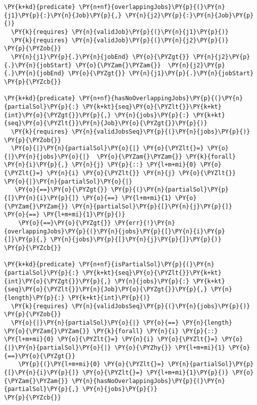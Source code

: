 \begin{Verbatim}[commandchars=\\\{\}, fontsize=\small]
\PY{k+kd}{predicate} \PY{n+nf}{overlappingJobs}\PY{p}{(}\PY{n}{j1}\PY{p}{:}\PY{n}{Job}\PY{p}{,} \PY{n}{j2}\PY{p}{:}\PY{n}{Job}\PY{p}{)}
  \PY{k}{requires} \PY{n}{validJob}\PY{p}{(}\PY{n}{j1}\PY{p}{)}
  \PY{k}{requires} \PY{n}{validJob}\PY{p}{(}\PY{n}{j2}\PY{p}{)}
\PY{p}{\PYZob{}}
  \PY{n}{j1}\PY{p}{.}\PY{n}{jobEnd} \PY{o}{\PYZgt{}} \PY{n}{j2}\PY{p}{.}\PY{n}{jobStart} \PY{o}{\PYZam{}\PYZam{}}  \PY{n}{j2}\PY{p}{.}\PY{n}{jobEnd} \PY{o}{\PYZgt{}} \PY{n}{j1}\PY{p}{.}\PY{n}{jobStart} 
\PY{p}{\PYZcb{}}

\PY{k+kd}{predicate} \PY{n+nf}{hasNoOverlappingJobs}\PY{p}{(}\PY{n}{partialSol}\PY{p}{:} \PY{k+kt}{seq}\PY{o}{\PYZlt{}}\PY{k+kt}{int}\PY{o}{\PYZgt{}}\PY{p}{,} \PY{n}{jobs}\PY{p}{:} \PY{k+kt}{seq}\PY{o}{\PYZlt{}}\PY{n}{Job}\PY{o}{\PYZgt{}}\PY{p}{)}
  \PY{k}{requires} \PY{n}{validJobsSeq}\PY{p}{(}\PY{n}{jobs}\PY{p}{)}
\PY{p}{\PYZob{}}
  \PY{o}{|}\PY{n}{partialSol}\PY{o}{|} \PY{o}{\PYZlt{}=} \PY{o}{|}\PY{n}{jobs}\PY{o}{|}  \PY{o}{\PYZam{}\PYZam{}} \PY{k}{forall} \PY{n}{i}\PY{p}{,} \PY{n}{j} \PY{p}{::} \PY{l+m+mi}{0} \PY{o}{\PYZlt{}=} \PY{n}{i} \PY{o}{\PYZlt{}} \PY{n}{j} \PY{o}{\PYZlt{}} \PY{o}{|}\PY{n}{partialSol}\PY{o}{|}
   \PY{o}{==}\PY{o}{\PYZgt{}} \PY{p}{(}\PY{n}{partialSol}\PY{p}{[}\PY{n}{i}\PY{p}{]} \PY{o}{==} \PY{l+m+mi}{1} \PY{o}{\PYZam{}\PYZam{}} \PY{n}{partialSol}\PY{p}{[}\PY{n}{j}\PY{p}{]} \PY{o}{==} \PY{l+m+mi}{1}\PY{p}{)}
    \PY{o}{==}\PY{o}{\PYZgt{}} \PY{err}{!}\PY{n}{overlappingJobs}\PY{p}{(}\PY{n}{jobs}\PY{p}{[}\PY{n}{i}\PY{p}{]}\PY{p}{,} \PY{n}{jobs}\PY{p}{[}\PY{n}{j}\PY{p}{]}\PY{p}{)}
\PY{p}{\PYZcb{}}

\PY{k+kd}{predicate} \PY{n+nf}{isPartialSol}\PY{p}{(}\PY{n}{partialSol}\PY{p}{:} \PY{k+kt}{seq}\PY{o}{\PYZlt{}}\PY{k+kt}{int}\PY{o}{\PYZgt{}}\PY{p}{,} \PY{n}{jobs}\PY{p}{:} \PY{k+kt}{seq}\PY{o}{\PYZlt{}}\PY{n}{Job}\PY{o}{\PYZgt{}}\PY{p}{,} \PY{n}{length}\PY{p}{:} \PY{k+kt}{int}\PY{p}{)}
  \PY{k}{requires} \PY{n}{validJobsSeq}\PY{p}{(}\PY{n}{jobs}\PY{p}{)}
\PY{p}{\PYZob{}}   
  \PY{o}{|}\PY{n}{partialSol}\PY{o}{|} \PY{o}{==} \PY{n}{length} \PY{o}{\PYZam{}\PYZam{}} \PY{k}{forall} \PY{n}{i} \PY{p}{::} \PY{l+m+mi}{0} \PY{o}{\PYZlt{}=} \PY{n}{i} \PY{o}{\PYZlt{}=} \PY{o}{|}\PY{n}{partialSol}\PY{o}{|} \PY{o}{\PYZhy{}} \PY{l+m+mi}{1} \PY{o}{==}\PY{o}{\PYZgt{}} 
    \PY{p}{(}\PY{l+m+mi}{0} \PY{o}{\PYZlt{}=} \PY{n}{partialSol}\PY{p}{[}\PY{n}{i}\PY{p}{]} \PY{o}{\PYZlt{}=} \PY{l+m+mi}{1}\PY{p}{)} \PY{o}{\PYZam{}\PYZam{}} \PY{n}{hasNoOverlappingJobs}\PY{p}{(}\PY{n}{partialSol}\PY{p}{,} \PY{n}{jobs}\PY{p}{)}
\PY{p}{\PYZcb{}}
\end{Verbatim}

